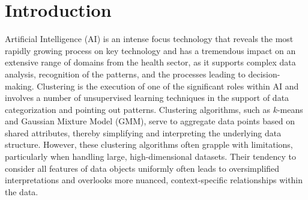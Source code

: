 
\section{Introduction}
Artificial Intelligence (AI) is an intense focus technology that reveals the most rapidly growing process on key technology and has a tremendous impact on an extensive range of domains from the health sector, as it supports complex data analysis, recognition of the patterns, and the processes leading to decision-making. Clustering is the execution of one of the significant roles within AI and involves a number of unsupervised learning techniques in the support of data categorization and pointing out patterns. Clustering algorithms, such as $k$-means\cite{lloyd1982LeastSquaresQuantization, macqueen1967MethodsClassificationAnalysis} and Gaussian Mixture Model (GMM)\cite{dempster1977MaximumLikelihoodIncomplete}, serve to aggregate data points based on shared attributes, thereby simplifying and interpreting the underlying data structure. However, these clustering algorithms often grapple with limitations, particularly when handling large, high-dimensional datasets. Their tendency to consider all features of data objects uniformly often leads to oversimplified interpretations and overlooks more nuanced, context-specific relationships within the data\cite{chen2023FastFlexibleBipartite, zhao2023MultiviewCoclusteringMultisimilarity, kumar2023CoclusteringBasedMethods}.

